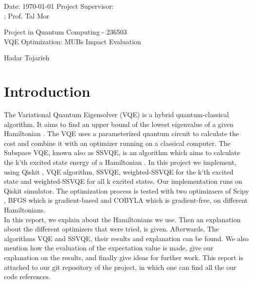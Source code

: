 \documentclass[12pt, a4paper]{article}
\begin{document}
    \onehalfspacing

    Date: \today{}     \hfill{} Project Supervisor: \\
    ; \hfill{} Prof. Tal Mor
    \\

    {\centering
    {\LARGE Project in Quantum Computing - 236503 \\}
    {\LARGE VQE Optimization: MUBs Impact Evaluation }

    {\Large Hadar Tojarieh \\}
    \par
    }

    \singlespacing
    \tableofcontents

    \onehalfspacing

    \section{Introduction}
    The Variational Quantum Eigensolver (VQE) is a hybrid quantum-classical algorithm. It aims to find an upper bound of the lowest eigenvalue of a given Hamiltonian \cite{peruzzo2013variational}.
    The VQE uses a parameterized quantum circuit to calculate the cost and combine it with an optimizer running on a classical computer.
    The Subspace VQE, known also as SSVQE, is an algorithm which aims to calculate the k’th excited
    state energy of a Hamiltonian \cite{nakanishi2019subspace}.
    In this project we implement, using Qiskit \cite{WinNT}, VQE algorithm, SSVQE, weighted-SSVQE for the k'th excited state and weighted-SSVQE for all k excited states. Our implementation runs on Qiskit simulator. The optimization process is tested with two optimizaers of Scipy \cite{scipy}, BFGS which is gradient-based and COBYLA which is gradient-free, on different Hamiltonians.\\
    In this report, we explain about the Hamiltonians we use. Then an explanation about the different optimizers that were tried, is given.
    Afterwards, The algorithms VQE and SSVQE, their results and explanation can be found.
    We also mention how the evaluation of the expectation value is made, give our explanation on the results, and finally give ideas for further work.
    This report is attached to our git repository of the project, in which one can find all the our code references.
\end{document}
